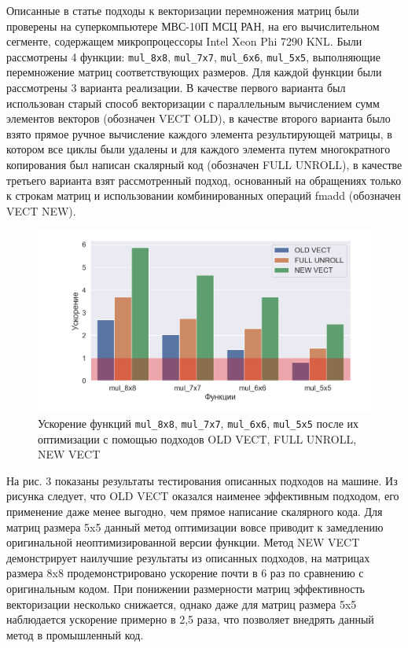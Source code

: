 Описанные в статье подходы к векторизации перемножения матриц были проверены на суперкомпьютере МВС-10П МСЦ РАН, на его вычислительном сегменте, содержащем микропроцессоры Intel Xeon Phi 7290 KNL.
Были рассмотрены 4 функции: \texttt{mul\_8x8}, \texttt{mul\_7x7}, \texttt{mul\_6x6}, \texttt{mul\_5x5}, выполняющие перемножение матриц соответствующих размеров.
Для каждой функции были рассмотрены 3 варианта реализации. В качестве первого варианта был использован старый способ векторизации с параллельным вычислением сумм элементов векторов (обозначен VECT OLD), в качестве второго варианта было взято прямое ручное вычисление каждого элемента результирующей матрицы, в котором все циклы были удалены и для каждого элемента путем многократного копирования был написан скалярный код (обозначен FULL UNROLL), в качестве третьего варианта взят рассмотренный подход, основанный на обращениях только к строкам матриц и использовании комбинированных операций fmadd (обозначен VECT NEW).

\begin{figure}[ht]
	\centering
		\includegraphics[width=1.00\textwidth]{./pics/text_4_spec_matr/res.png}
	\caption{Ускорение функций \texttt{mul\_8x8}, \texttt{mul\_7x7}, \texttt{mul\_6x6}, \texttt{mul\_5x5} после их оптимизации с помощью подходов OLD VECT, FULL UNROLL, NEW VECT}
	\label{fig:text_4_spec_matr_res}
\end{figure}

На рис. 3 показаны результаты тестирования описанных подходов на машине.
Из рисунка следует, что OLD VECT оказался наименее эффективным подходом, его применение даже менее выгодно, чем прямое написание скалярного кода.
Для матриц размера 5x5 данный метод оптимизации вовсе приводит к замедлению оригинальной неоптимизированной версии функции. Метод NEW VECT демонстрирует наилучшие результаты из описанных подходов, на матрицах размера 8x8 продемонстрировано ускорение почти в 6 раз по сравнению с оригинальным кодом. При понижении размерности матриц эффективность векторизации несколько снижается, однако даже для матриц размера 5x5 наблюдается ускорение примерно в 2,5 раза, что позволяет внедрять данный метод в промышленный код.
